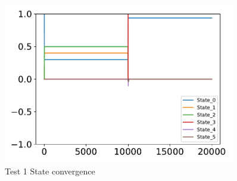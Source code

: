 \begin{figure}[htbp]\centerline{\includegraphics[width=0.9\textwidth, keepaspectratio]{AutoTeX/Test11}}\caption{Test 1 State convergence}\label{fig:Test11}\end{figure}